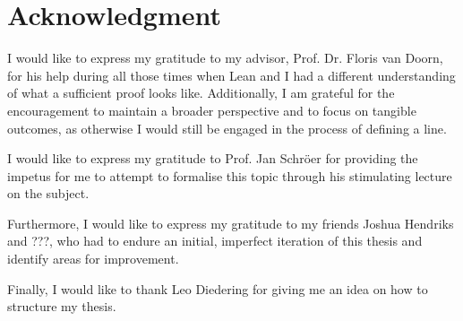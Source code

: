 \section*{Acknowledgment}
I would like to express my gratitude to my advisor, Prof. Dr. Floris van Doorn, for his help during all those times when Lean and I had a different understanding of what a sufficient proof looks like.
Additionally, I am grateful for the encouragement to maintain a broader perspective and to focus on tangible outcomes, as otherwise I would still be engaged in the process of defining a line.

I would like to express my gratitude to Prof. Jan Schröer for providing the impetus for me to attempt to formalise this topic through his stimulating lecture on the subject.

Furthermore, I would like to express my gratitude to my friends Joshua Hendriks and ???, who had to endure an initial, imperfect iteration of this thesis and identify areas for improvement. 

Finally, I would like to thank Leo Diedering for giving me an idea on how to structure my thesis.
